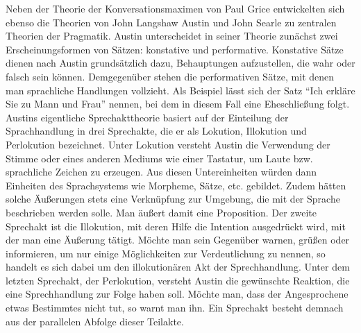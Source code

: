 Neben der Theorie der Konversationsmaximen von Paul Grice entwickelten sich ebenso die Theorien von John Langshaw Austin und John Searle zu zentralen Theorien der Pragmatik.
Austin unterscheidet in seiner Theorie zunächst zwei Erscheinungsformen von Sätzen: konstative und performative.
Konstative Sätze dienen nach Austin grundsätzlich dazu, Behauptungen aufzustellen, die wahr oder falsch sein können.
Demgegenüber stehen die performativen Sätze, mit denen man sprachliche Handlungen vollzieht\cite[S. 207]{AL04}.
Als Beispiel lässt sich der Satz "`Ich erkläre Sie zu Mann und Frau"' nennen, bei dem in diesem Fall eine Eheschließung folgt.
Austins eigentliche Sprechakttheorie basiert auf der Einteilung der Sprachhandlung in drei Sprechakte, die er als Lokution, Illokution und Perlokution bezeichnet.
Unter Lokution versteht Austin die Verwendung der Stimme oder eines anderen Mediums wie einer Tastatur, um Laute bzw. sprachliche Zeichen zu erzeugen.
Aus diesen Untereinheiten würden dann Einheiten des Sprachsystems wie Morpheme, Sätze, etc. gebildet.
Zudem hätten solche Äußerungen stets eine Verknüpfung zur Umgebung, die mit der Sprache beschrieben werden solle.
Man äußert damit eine Proposition\cite[S. 210]{AL04}.
Der zweite Sprechakt ist die Illokution, mit deren Hilfe die Intention ausgedrückt wird, mit der man eine Äußerung tätigt.
Möchte man sein Gegenüber warnen, grüßen oder informieren, um nur einige Möglichkeiten zur Verdeutlichung zu nennen, so handelt es sich dabei um den illokutionären Akt der Sprechhandlung.
Unter dem letzten Sprechakt, der Perlokution, versteht Austin die gewünschte Reaktion, die eine Sprechhandlung zur Folge haben soll.
Möchte man, dass der Angesprochene etwas Bestimmtes nicht tut, so warnt man ihn.
Ein Sprechakt besteht demnach aus der parallelen Abfolge dieser Teilakte.

